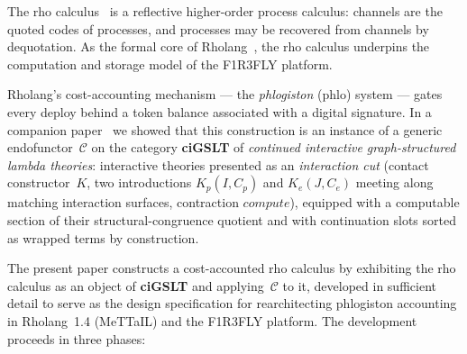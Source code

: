 \documentclass[11pt,a4paper]{article}
\begin{document}
The rho calculus~\cite{MeredithRadestock2005} is a reflective
higher-order process calculus: channels are the quoted codes of
processes, and processes may be recovered from channels by
dequotation.  As the formal core of
Rholang~\cite{RholangSpec}, the rho calculus underpins the
computation and storage model of the F1R3FLY platform.

Rholang's cost-accounting mechanism --- the \emph{phlogiston}
(phlo) system --- gates every deploy behind a token balance
associated with a digital signature.  In a companion
paper~\cite{CostEndofunctor} we showed that this construction
is an instance of a generic endofunctor~$\mathcal{C}$ on the
category \textbf{ciGSLT} of \emph{continued interactive
graph-structured lambda theories}: interactive theories
presented as an \emph{interaction cut} (contact constructor~$K$,
two introductions $K_p(I, C_p)$ and $K_e(J, C_e)$ meeting
along matching interaction surfaces, contraction
$\mathit{compute}$), equipped with a computable section of
their structural-congruence quotient and with continuation
slots sorted as wrapped terms by construction.

The present paper constructs a cost-accounted rho calculus by
exhibiting the rho calculus as an object of \textbf{ciGSLT} and
applying~$\mathcal{C}$ to it, developed in sufficient detail to
serve as the design specification for rearchitecting phlogiston
accounting in Rholang~1.4 (MeTTaIL) and the F1R3FLY platform.
The development proceeds in three phases:
\end{document}

